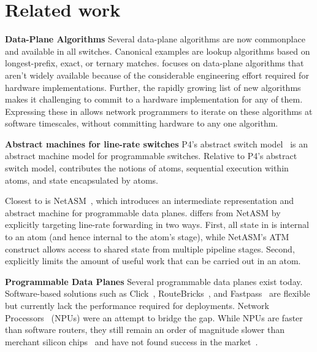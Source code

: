 \section{Related work}
\label{s:related}

\textbf{Data-Plane Algorithms}
Several data-plane algorithms are now commonplace and available in all
switches. Canonical examples are lookup algorithms based on longest-prefix,
exact, or ternary matches. \pktlanguage focuses on data-plane algorithms that
aren't widely available because of the considerable engineering effort required
for hardware implementations. Further, the rapidly growing list of new
algorithms~\cite{pdq, d3, detail, codel, conga} makes it challenging to commit
to a hardware implementation for any of them.  Expressing these in \pktlanguage
allows network programmers to iterate on these algorithms at software
timescales, without committing hardware to any one algorithm.

\textbf{Abstract machines for line-rate switches}
P4's abstract switch model~\cite{p4} is an abstract machine model for
programmable switches.  Relative to P4's abstract switch model, \absmachine
contributes the notions of atoms, sequential execution within atoms, and state
encapsulated by atoms.

Closest to \absmachine is NetASM~\cite{netasm}, which introduces an
intermediate representation and abstract machine for programmable data planes.
\absmachine differs from NetASM by explicitly targeting line-rate forwarding in
two ways.  First, all state in \absmachine is internal to an atom (and hence
internal to the atom's stage), while NetASM's ATM construct allows access to
shared state from multiple pipeline stages. Second, \absmachine explicitly
limits the amount of useful work that can be carried out in an atom.

\textbf{Programmable Data Planes}
Several programmable data planes exist today. Software-based solutions such as
Click~\cite{click}, RouteBricks~\cite{routebricks}, and
Fastpass~\cite{fastpass} are flexible but currently lack the performance
required for deployments. Network Processors~\cite{ixp2800, ixp4xx} (NPUs) were
an attempt to bridge the gap.  While NPUs are faster than software routers,
they still remain an order of magnitude slower than merchant silicon
chips~\cite{rmt} and have not found success in the market~\cite{npfail}.

